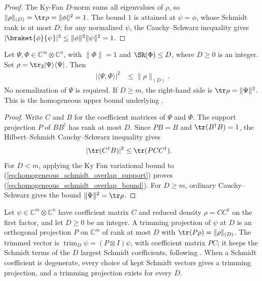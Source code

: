 \begin{proof}
    \leanok
    The Ky-Fan $D$-norm sums all eigenvalues of $\rho$, so
    $\|\rho\|_{(D)}=\tr\rho=\|\phi\|^2=1$. The bound $1$ is attained at
    $\psi=\phi$, whose Schmidt rank is at most $D$; for any normalized
    $\psi$, the Cauchy--Schwarz inequality gives
    $|\braket{\phi}{\psi}|^2\le\|\phi\|^2\|\psi\|^2=1$.
\end{proof}

\begin{theorem}
    \label{thm:homogeneous_schmidt_overlap_bound}
    \leanok
    Let $\Psi,\Phi\in\mathbb C^m\otimes\mathbb C^n$, with
    $\|\Phi\|=1$ and $\SR(\Phi)\le D$, where $D\ge0$ is an integer.
    Set $\rho=\tr_2|\Psi\rangle\langle\Psi|$. Then
    \begin{align}
        |\langle\Psi,\Phi\rangle|^2 & \le\|\rho\|_{(D)}.
        \label{eq:homogeneous_schmidt_overlap_bound}
    \end{align}
    No normalization of $\Psi$ is required. If $D\ge m$, the right-hand
    side is $\tr\rho=\|\Psi\|^2$. This is the homogeneous upper bound
    underlying \cite[Lemma~3.1]{Wolf2012Quantum}.
\end{theorem}

\begin{proof}
    \leanok
    Write $C$ and $B$ for the coefficient matrices of $\Psi$ and $\Phi$.
    The support projection $P$ of $BB^\dagger$ has rank at most $D$.
    Since $PB=B$ and $\tr(B^\dagger B)=1$, the Hilbert--Schmidt
    Cauchy--Schwarz inequality gives
    \begin{align}
        |\tr(C^\dagger B)|^2 & \le\tr(PCC^\dagger).
        \label{eq:homogeneous_schmidt_overlap_support}
    \end{align}
    For $D<m$, applying the Ky Fan variational bound to
    (\ref{eq:homogeneous_schmidt_overlap_support}) proves
    (\ref{eq:homogeneous_schmidt_overlap_bound}).
    For $D\ge m$, ordinary Cauchy--Schwarz gives the bound
    $\|\Psi\|^2=\tr\rho$.
\end{proof}

\begin{definition}
    \label{def:trimming_projection}
    \leanok
    Let $\psi\in\mathbb C^m\otimes\mathbb C^n$ have coefficient matrix $C$
    and reduced density $\rho=CC^\dagger$ on the first factor, and let
    $D\ge0$ be an integer. A trimming projection of $\psi$ at $D$ is an
    orthogonal projection $P$ on $\mathbb C^m$ of rank at most $D$ with
    $\tr(P\rho)=\|\rho\|_{(D)}$. The trimmed vector is
    $\operatorname{trim}_D\psi=(P\otimes I)\psi$, with coefficient matrix
    $PC$; it keeps the Schmidt terms of the $D$ largest Schmidt
    coefficients, following \cite{Landau2013PolynomialTime}. When a Schmidt
    coefficient is degenerate, every choice of kept Schmidt vectors gives a
    trimming projection, and a trimming projection exists for every $D$.
\end{definition}

